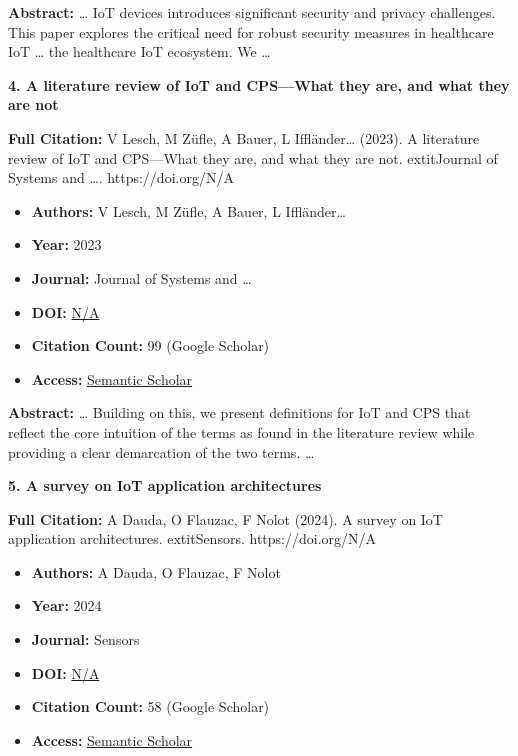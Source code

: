\documentclass[11pt,a4paper]{article}
\begin{document}
\textbf{Abstract:} … IoT devices introduces significant security and privacy challenges. This paper explores the critical need for robust security measures in healthcare IoT … the healthcare IoT ecosystem. We …\par\vspace{0.5em}



\textbf{4. A literature review of IoT and CPS—What they are, and what they are not}

\textbf{Full Citation:} V Lesch, M Züfle, A Bauer, L Iffländer… (2023). A literature review of IoT and CPS—What they are, and what they are not. 	extit{Journal of Systems and …}. https://doi.org/N/A

\begin{resultbox}
\begin{itemize}[leftmargin=*]
    \item \textbf{Authors:} V Lesch, M Züfle, A Bauer, L Iffländer…
    \item \textbf{Year:} 2023
    \item \textbf{Journal:} Journal of Systems and …
    
    
    
    \item \textbf{DOI:} \href{https://doi.org/}{N/A}
    \item \textbf{Citation Count:} 99 (Google Scholar)
    \item \textbf{Access:} \href{https://www.sciencedirect.com/science/article/pii/S0164121223000262}{Semantic Scholar}
\end{itemize}
\end{resultbox}

\textbf{Abstract:} … Building on this, we present definitions for IoT and CPS that reflect the core intuition of the terms as found in the literature review while providing a clear demarcation of the two terms. …\par\vspace{0.5em}



\textbf{5. A survey on IoT application architectures}

\textbf{Full Citation:} A Dauda, O Flauzac, F Nolot (2024). A survey on IoT application architectures. 	extit{Sensors}. https://doi.org/N/A

\begin{resultbox}
\begin{itemize}[leftmargin=*]
    \item \textbf{Authors:} A Dauda, O Flauzac, F Nolot
    \item \textbf{Year:} 2024
    \item \textbf{Journal:} Sensors
    
    
    
    \item \textbf{DOI:} \href{https://doi.org/}{N/A}
    \item \textbf{Citation Count:} 58 (Google Scholar)
    \item \textbf{Access:} \href{https://www.mdpi.com/1424-8220/24/16/5320}{Semantic Scholar}
\end{itemize}
\end{resultbox}
\end{document}
